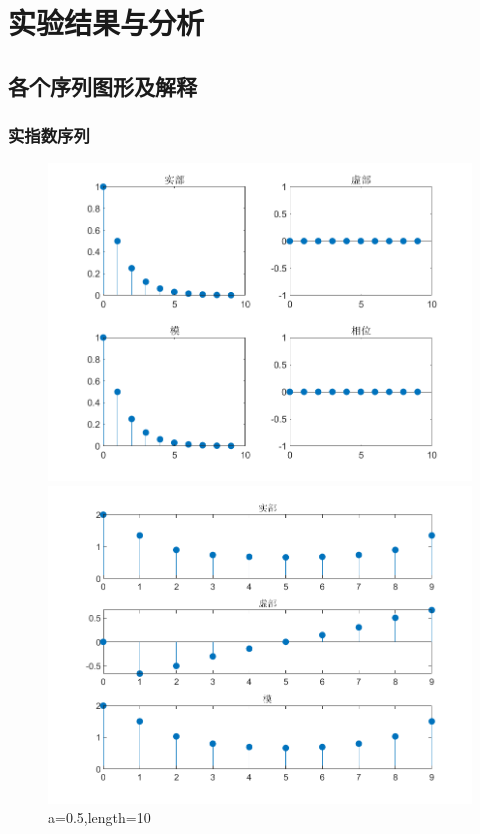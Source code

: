 \documentclass{../source/zjureport}
\begin{document}
    \section{实验结果与分析}
        \subsection{各个序列图形及解释}
            \subsubsection{实指数序列}
                \begin{figure}[htbp]
                    \centering
                    \begin{minipage}[t]{0.48\textwidth}
                    \centering
                    \includegraphics[width=\textwidth]{figure/实指数序列_a=05,length=10.png}
                    \end{minipage}
                    \begin{minipage}[t]{0.48\textwidth}
                    \centering
                    \includegraphics[width=\textwidth]{figure/频谱_实指数序列_a=05,length=10.png}
                    \end{minipage}
                    \caption{a=0.5,length=10}
                \end{figure}
\end{document}
